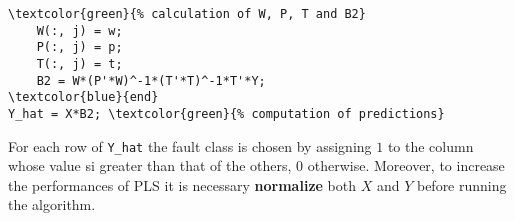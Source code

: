 \begin{frame}[fragile]
	\begin{Verbatim}[tabsize=4, commandchars=\\\{\}, frame=bottomline]
	\textcolor{green}{% calculation of W, P, T and B2}
	W(:, j) = w;
	P(:, j) = p;
	T(:, j) = t;
	B2 = W*(P'*W)^-1*(T'*T)^-1*T'*Y;
\textcolor{blue}{end}
Y_hat = X*B2; \textcolor{green}{% computation of predictions}
	\end{Verbatim}
For each row of \verb|Y_hat| the fault class is chosen by assigning $1$ to the column whose value si greater than that of the others, $0$ otherwise. Moreover, to increase the performances of PLS it is necessary \textbf{normalize} both $X$ and $Y$ before running the algorithm.

\end{frame}
